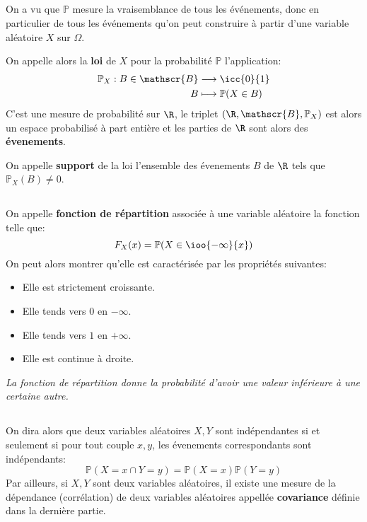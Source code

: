 \subsection*{}
On a vu que \(\mathbb{P}\) mesure la vraisemblance de tous les événements, donc en particulier de tous les événements qu'on peut construire à partir d'une variable aléatoire \(X\) sur \(\Omega\).\<

On appelle alors la \textbf{loi} de \(X\) pour la probabilité \(\mathbb{P}\) l'application:
\[
   \begin{aligned}
      \mathbb{P}_X: B \in \mathscr{B} &\longrightarrow \icc{0}{1}\\
      B &\longmapsto \mathbb{P}(X \in B)
   \end{aligned}
\]
C'est une mesure de probabilité sur \(\R\), le triplet \((\R, \mathscr{B}, \mathbb{P}_X)\) est alors un espace probabilisé à part entière et les parties de \(\R\) sont alors des \textbf{évenements}.\<

On appelle \textbf{support} de la loi l'ensemble des évenements \(B\) de \(\R\) tels que  \(\mathbb{P}_X(B) \neq 0\).\+

\subsection*{}
On appelle \textbf{fonction de répartition} associée à une variable aléatoire la fonction telle que:
\[
   F_X(x) = \mathbb{P}(X \in \ioo{-\infty}{x})   
\]
On peut alors montrer qu'elle est caractérisée par les propriétés suivantes:
\begin{itemize}
   \item Elle est strictement croissante.
   \item Elle tends vers \(0\) en \(-\infty\).
   \item Elle tends vers \(1\) en \(+\infty\).
   \item Elle est continue à droite.
\end{itemize}
\begin{center}
   \textit{La fonction de répartition donne la probabilité d'avoir une valeur inférieure à une certaine autre.}
\end{center}

\subsection*{}
On dira alors que deux variables aléatoires \(X, Y\) sont indépendantes si et seulement si pour tout couple \(x, y\), les évenements correspondants sont indépendants:
\[
   \mathbb{P}(X = x \cap Y = y) = \mathbb{P}(X = x)\mathbb{P}(Y = y)  
\]
Par ailleurs, si \(X, Y\) sont deux variables aléatoires, il existe une mesure de la dépendance (corrélation) de deux variables aléatoires appellée \textbf{covariance} définie dans la dernière partie.
